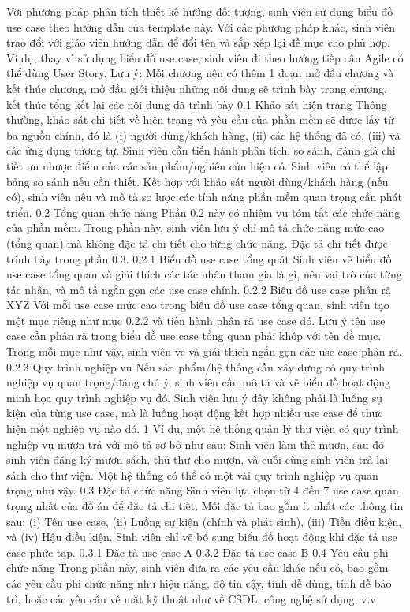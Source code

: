 Với phương pháp phân tích thiết kế hướng đối tượng, sinh viên sử dụng biểu đồ
use case theo hướng dẫn của template này. Với các phương pháp khác, sinh viên
trao đổi với giáo viên hướng dẫn để đổi tên và sắp xếp lại đề mục cho phù hợp. Ví
dụ, thay vì sử dụng biểu đồ use case, sinh viên đi theo hướng tiếp cận Agile có thể
dùng User Story.
Lưu ý: Mỗi chương nên có thêm 1 đoạn mở đầu chương và kết thúc chương, mở
đầu giới thiệu những nội dung sẽ trình bày trong chương, kết thúc tổng kết lại các
nội dung đã trình bày
0.1 Khảo sát hiện trạng
Thông thường, khảo sát chi tiết về hiện trạng và yêu cầu của phần mềm sẽ được
lấy từ ba nguồn chính, đó là (i) người dùng/khách hàng, (ii) các hệ thống đã có,
(iii) và các ứng dụng tương tự. Sinh viên cần tiến hành phân tích, so sánh, đánh giá
chi tiết ưu nhược điểm của các sản phẩm/nghiên cứu hiện có. Sinh viên có thể lập
bảng so sánh nếu cần thiết. Kết hợp với khảo sát người dùng/khách hàng (nếu có),
sinh viên nêu và mô tả sơ lược các tính năng phần mềm quan trọng cần phát triển.
0.2 Tổng quan chức năng
Phần 0.2 này có nhiệm vụ tóm tắt các chức năng của phần mềm. Trong phần
này, sinh viên lưu ý chỉ mô tả chức năng mức cao (tổng quan) mà không đặc tả chi
tiết cho từng chức năng. Đặc tả chi tiết được trình bày trong phần 0.3.
0.2.1 Biểu đồ use case tổng quát
Sinh viên vẽ biểu đồ use case tổng quan và giải thích các tác nhân tham gia là
gì, nêu vai trò của từng tác nhân, và mô tả ngắn gọn các use case chính.
0.2.2 Biểu đồ use case phân rã XYZ
Với mỗi use case mức cao trong biểu đồ use case tổng quan, sinh viên tạo một
mục riêng như mục 0.2.2 và tiến hành phân rã use case đó. Lưu ý tên use case cần
phân rã trong biểu đồ use case tổng quan phải khớp với tên đề mục.
Trong mỗi mục như vậy, sinh viên vẽ và giải thích ngắn gọn các use case phân
rã.
0.2.3 Quy trình nghiệp vụ
Nếu sản phẩm/hệ thống cần xây dựng có quy trình nghiệp vụ quan trọng/đáng
chú ý, sinh viên cần mô tả và vẽ biểu đồ hoạt động minh họa quy trình nghiệp vụ
đó. Sinh viên lưu ý đây không phải là luồng sự kiện của từng use case, mà là luồng
hoạt động kết hợp nhiều use case để thực hiện một nghiệp vụ nào đó.
1
Ví dụ, một hệ thống quản lý thư viện có quy trình nghiệp vụ mượn trả với mô tả
sơ bộ như sau: Sinh viên làm thẻ mượn, sau đó sinh viên đăng ký mượn sách, thủ
thư cho mượn, và cuối cùng sinh viên trả lại sách cho thư viện. Một hệ thống có
thể có một vài quy trình nghiệp vụ quan trọng như vậy.
0.3 Đặc tả chức năng
Sinh viên lựa chọn từ 4 đến 7 use case quan trọng nhất của đồ án để đặc tả chi
tiết. Mỗi đặc tả bao gồm ít nhất các thông tin sau: (i) Tên use case, (ii) Luồng sự
kiện (chính và phát sinh), (iii) Tiền điều kiện, và (iv) Hậu điều kiện. Sinh viên chỉ
vẽ bổ sung biểu đồ hoạt động khi đặc tả use case phức tạp.
0.3.1 Đặc tả use case A
0.3.2 Đặc tả use case B
0.4 Yêu cầu phi chức năng
Trong phần này, sinh viên đưa ra các yêu cầu khác nếu có, bao gồm các yêu cầu
phi chức năng như hiệu năng, độ tin cậy, tính dễ dùng, tính dễ bảo trì, hoặc các yêu
cầu về mặt kỹ thuật như về CSDL, công nghệ sử dụng, v.v